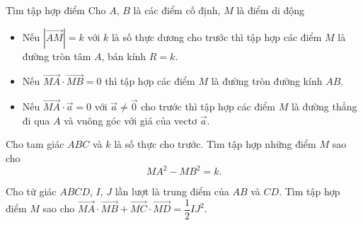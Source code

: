 \begin{dang}{Tìm tập hợp điểm}
Cho $A$, $B$ là các điểm cố định, $M$ là điểm di động
\begin{itemize}
	\item Nếu $\left| \overrightarrow{AM} \right|=k$ với $k$ là số thực dương cho trước thì tập hợp các điểm $M$ là đường tròn tâm $A$, bán kính $R=k$.
	\item Nếu $\overrightarrow{MA}\cdot \overrightarrow{MB}=0$ thì tập hợp các điểm $M$ là đường tròn đường kính $AB$.
	\item Nếu $\overrightarrow{MA}\cdot \overrightarrow{a}=0$ với $\overrightarrow{a}\neq \overrightarrow{0}$ cho trước thì tập hợp các điểm $M$ là đường thẳng đi qua $A$ và vuông góc với giá của vectơ $\overrightarrow{a}$.
\end{itemize}
\end{dang}
\begin{vd}%
	Cho tam giác $ABC$ và $k$ là số thực cho trước. Tìm tập hợp những điểm $M$ sao cho $$MA^2-MB^2=k.$$
\end{vd}
\begin{vd}%
	Cho tứ giác $ABCD$, $I$, $J$ lần lượt là trung điểm của $AB$ và $CD$. Tìm tập hợp điểm $M$ sao cho $\overrightarrow{MA}\cdot \overrightarrow{MB}+\overrightarrow{MC}\cdot \overrightarrow{MD}=\dfrac{1}{2}IJ^2$.
\end{vd}
